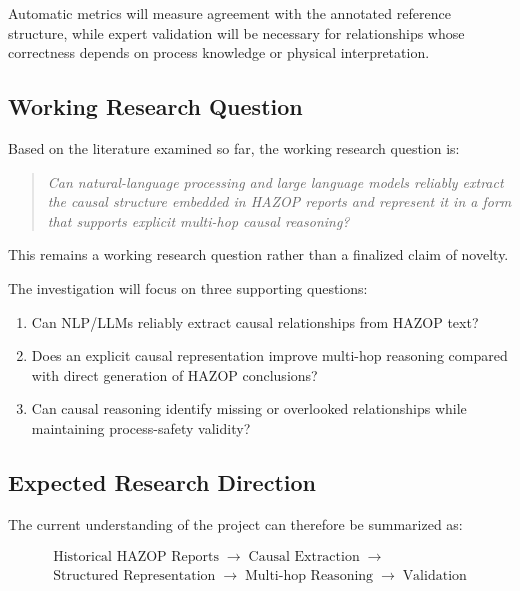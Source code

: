 Automatic metrics will measure agreement with the annotated reference
structure, while expert validation will be necessary for relationships
whose correctness depends on process knowledge or physical
interpretation.

\subsection{Working Research Question}

Based on the literature examined so far, the working research question
is:

\begin{quote}
\textit{Can natural-language processing and large language models
reliably extract the causal structure embedded in HAZOP reports and
represent it in a form that supports explicit multi-hop causal
reasoning?}
\end{quote}

This remains a working research question rather than a finalized claim
of novelty.

The investigation will focus on three supporting questions:

\begin{enumerate}
    \item Can NLP/LLMs reliably extract causal relationships from
    HAZOP text?

    \item Does an explicit causal representation improve multi-hop
    reasoning compared with direct generation of HAZOP conclusions?

    \item Can causal reasoning identify missing or overlooked
    relationships while maintaining process-safety validity?
\end{enumerate}

\subsection{Expected Research Direction}

The current understanding of the project can therefore be summarized
as:

\[
\boxed{\begin{gathered}
\text{Historical HAZOP Reports}\;\rightarrow\;\text{Causal Extraction}\;\rightarrow\\[-1pt]
\text{Structured Representation}\;\rightarrow\;\text{Multi-hop Reasoning}\;\rightarrow\;\text{Validation}
\end{gathered}}
\]

